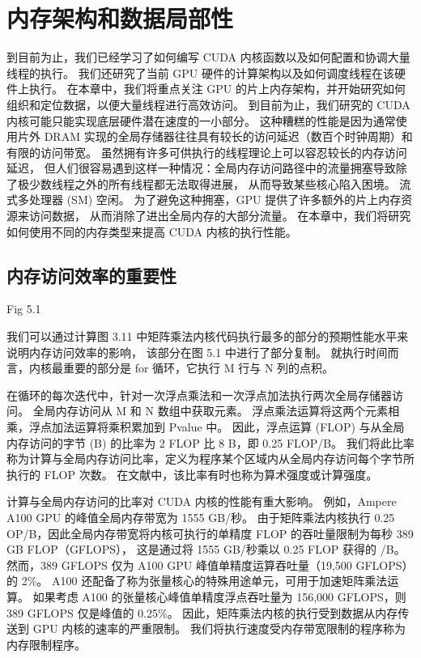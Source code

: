 \section{内存架构和数据局部性}
到目前为止，我们已经学习了如何编写 CUDA 内核函数以及如何配置和协调大量线程的执行。 
我们还研究了当前 GPU 硬件的计算架构以及如何调度线程在该硬件上执行。 
在本章中，我们将重点关注 GPU 的片上内存架构，并开始研究如何组织和定位数据，以便大量线程进行高效访问。 
到目前为止，我们研究的 CUDA 内核可能只能实现底层硬件潜在速度的一小部分。 
这种糟糕的性能是因为通常使用片外 DRAM 实现的全局存储器往往具有较长的访问延迟（数百个时钟周期）和有限的访问带宽。 
虽然拥有许多可供执行的线程理论上可以容忍较长的内存访问延迟，
但人们很容易遇到这样一种情况：全局内存访问路径中的流量拥塞导致除了极少数线程之外的所有线程都无法取得进展，
从而导致某些核心陷入困境。 流式多处理器 (SM) 空闲。 为了避免这种拥塞，GPU 提供了许多额外的片上内存资源来访问数据，
从而消除了进出全局内存的大部分流量。 在本章中，我们将研究如何使用不同的内存类型来提高 CUDA 内核的执行性能。

\subsection{内存访问效率的重要性}
{\color{red} Fig 5.1}

我们可以通过计算图 3.11 中矩阵乘法内核代码执行最多的部分的预期性能水平来说明内存访问效率的影响，
该部分在图 5.1 中进行了部分复制。 就执行时间而言，内核最重要的部分是 for 循环，它执行 M 行与 N 列的点积。

在循环的每次迭代中，针对一次浮点乘法和一次浮点加法执行两次全局存储器访问。 全局内存访问从 M 和 N 数组中获取元素。 
浮点乘法运算将这两个元素相乘，浮点加法运算将乘积累加到 Pvalue 中。 
因此，浮点运算 (FLOP) 与从全局内存访问的字节 (B) 的比率为 2 FLOP 比 8 B，即 0.25 FLOP/B。 
我们将此比率称为计算与全局内存访问比率，定义为程序某个区域内从全局内存访问每个字节所执行的 FLOP 次数。 
在文献中，该比率有时也称为算术强度或计算强度。

计算与全局内存访问的比率对 CUDA 内核的性能有重大影响。 例如，Ampere A100 GPU 的峰值全局内存带宽为 1555 GB/秒。 
由于矩阵乘法内核执行 0.25 OP/B，因此全局内存带宽将内核可执行的单精度 FLOP 的吞吐量限制为每秒 389 GB FLOP（GFLOPS），
这是通过将 1555 GB/秒乘以 0.25 FLOP 获得的 /B。 
然而，389 GFLOPS 仅为 A100 GPU 峰值单精度运算吞吐量（19,500 GFLOPS）的 2\%。 
A100 还配备了称为张量核心的特殊用途单元，可用于加速矩阵乘法运算。 
如果考虑 A100 的张量核心峰值单精度浮点吞吐量为 156,000 GFLOPS，则 389 GFLOPS 仅是峰值的 0.25\%。 
因此，矩阵乘法内核的执行受到数据从内存传送到 GPU 内核的速率的严重限制。 
我们将执行速度受内存带宽限制的程序称为内存限制程序。

